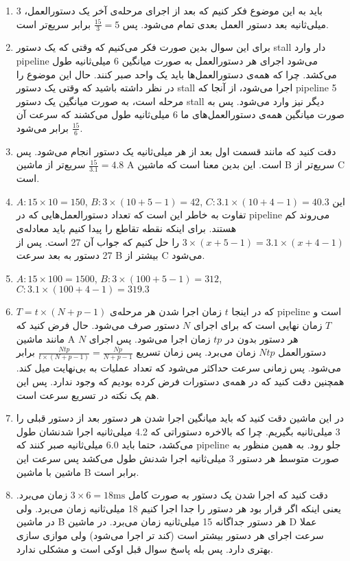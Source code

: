
\begin{enumerate}[leftmargin=0cm,itemindent=.5cm,label=\alph*.]
    \item باید به این موضوع فکر کنیم که بعد از اجرای مرحله‌ی آخر یک دستور‌العمل، 3 میلی‌ثانیه بعد دستور العمل بعدی تمام می‌شود. پس
    $\frac{15}{3}=5$
    برابر سریع‌تر است.
    \item برای این سوال بدین صورت فکر می‌کنیم که وقتی که یک دستور
    stall
    دار وارد
    pipeline
    می‌شود اجرای هر دستور‌العمل به صورت میانگین 6 میلی‌ثانیه طول می‌کشد. چرا که همه‌ی دستور‌العمل‌ها باید یک واحد صبر کنند.
    حال این موضوع را در نظر داشته باشید که وقتی یک دستور
    stall
    اجرا می‌شود، از آنجا که
    pipeline
    5 مرحله است،
    به صورت میانگین یک دستور
    stall
    دیگر نیز وارد می‌شود. پس به صورت میانگین همه‌ی دستور‌العمل‌های ما 6 میلی‌ثانیه طول می‌کشند که سرعت آن
    $\frac{15}{6}$
    برابر می‌شود.
    \item دقت کنید که مانند قسمت اول بعد از هر  میلی‌ثانیه یک دستور انجام می‌شود. پس
    $\frac{15}{3.1} = 4.8$
    سریع‌تر از ماشین A است.
    این بدین معنا است که ماشین
    B
    سریع‌تر از
    C
    است.
    \item $A: 15 \times 10 = 150$, $B: 3 \times (10 + 5 - 1) = 42$, $C: 3.1 \times (10 + 4 - 1) = 40.3$
    این تفاوت به خاطر این است که تعداد دستورالعمل‌هایی که در
    pipeline
    می‌روند کم هستند.
    برای اینکه نقطه تقاطع را پیدا کنیم باید معادله‌ی
    $3 \times (x + 5 - 1) = 3.1 \times (x + 4 - 1)$
    را حل کنیم که جواب آن 27 است.
    پس از 27 دستور به بعد سرعت
    B
    بیشتر از
    C
    می‌شود.
    \item $A: 15 \times 100 = 1500$, $B: 3 \times (100 + 5 - 1) = 312$, $C: 3.1 \times (100 + 4 - 1) = 319.3$
    \item $T = t \times (N + p - 1)$
    که در اینجا
    $t$
    زمان اجرا شدن هر مرحله‌ی
    pipeline
    است و
    $T$
    زمان نهایی است که برای اجرای
    $N$
    دستور صرف می‌شود.
    حال فرض کنید که مانند ماشین
    A
    هر دستور بدون
    در
    $tp$
    زمان اجرا می‌شود.
    پس اجرای
    $N$
    دستور‌العمل‌
    $Ntp$
    زمان می‌برد.
    پس زمان تسریع
    $\frac{Ntp}{t \times (N + p - 1)} = \frac{Np}{N + p -1}$
    برابر می‌شود.
    پس زمانی سرعت حداکثر می‌شود که تعداد عملیات به بی‌نهایت میل کند.
    همچنین دقت کنید که در همه‌ی دستورات فرض کرده بودیم که
    وجود ندارد. پس این هم یک نکته در تسریع سرعت است.
    \item در این ماشین دقت کنید که باید میانگین اجرا شدن هر دستور بعد از دستور قبلی را 3 میلی‌ثانیه بگیریم.
    چرا که بالاخره دستوراتی که 4.2 میلی‌ثانیه اجرا شدنشان طول می‌کشد، حتما باید 6.0 میلی‌ثانیه صبر کنند که
    pipeline
    جلو رود. به همین منظور به صورت متوسط هر دستور 3 میلی‌ثانیه اجرا شدنش طول می‌کشد پس سرعت این ماشین
    با ماشین
    B
    برابر است.
    \item دقت کنید که اجرا شدن یک دستور به صورت کامل
    $3 \times 6 = 18 \text{ms}$
    زمان می‌برد. یعنی اینکه اگر قرار بود هر دستور را جدا اجرا کنیم 18 میلی‌ثانیه زمان می‌برد. ولی در ماشین
    B
    هر دستور جداگانه 15 میلی‌ثانیه زمان می‌برد.
    در ماشین
    D
    عملا سرعت اجرای هر دستور بیشتر است (کند تر اجرا می‌شود) ولی موازی سازی بهتری دارد. پس بله پاسخ سوال قبل
    اوکی است و مشکلی ندارد.
\end{enumerate}